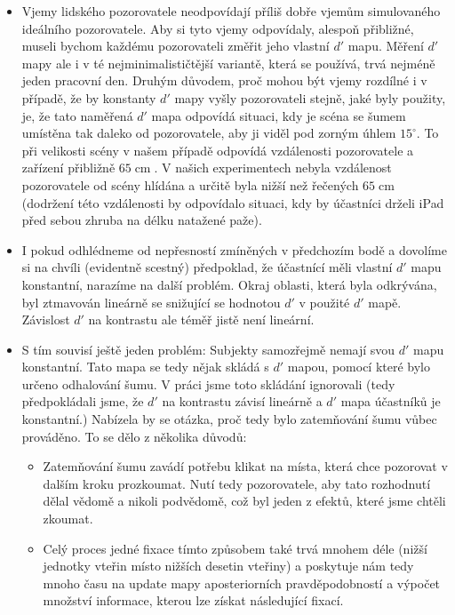 \begin{itemize}

\item Vjemy lidského pozorovatele neodpovídají příliš dobře vjemům simulovaného
ideálního pozorovatele. Aby si tyto vjemy odpovídaly, alespoň přibližné, museli
bychom každému pozorovateli změřit jeho vlastní $d'$ mapu. Měření $d'$ mapy ale
i  v té nejminimalističtější variantě, která se používá, trvá nejméně jeden
pracovní den. Druhým důvodem, proč mohou být vjemy rozdílné i v případě, že by
konstanty $d'$ mapy vyšly pozorovateli stejně, jaké byly použity, je, že tato
naměřená $d'$ mapa odpovídá situaci, kdy je scéna se šumem umístěna tak daleko
od pozorovatele, aby ji viděl pod zorným úhlem $15^\circ$. To při velikosti
scény v našem případě odpovídá vzdálenosti pozorovatele a zařízení přibližně
$65 \operatorname{cm}$. V našich experimentech nebyla vzdálenost pozorovatele od
scény hlídána a určitě byla nižší než řečených $65 \operatorname{cm}$
(dodržení této vzdálenosti by odpovídalo situaci, kdy by účastníci drželi iPad
před sebou zhruba na délku natažené paže). 

\item I pokud odhlédneme od nepřesností zmíněných v předchozím bodě a dovolíme
si na chvíli (evidentně scestný) předpoklad, že účastnící měli vlastní $d'$ mapu
konstantní, narazíme na další problém. Okraj oblasti, která byla odkrývána,
byl ztmavován lineárně se snižující se hodnotou $d'$ v použité $d'$ mapě.
Závislost $d'$ na kontrastu ale téměř jistě
není lineární.

\item S tím souvisí ještě jeden problém: Subjekty samozřejmě nemají svou $d'$
mapu konstantní. Tato mapa se tedy nějak skládá s $d'$ mapou, pomocí které
bylo určeno odhalování šumu. V práci jsme toto skládání ignorovali (tedy
předpokládali jsme, že $d'$ na kontrastu závisí lineárně a $d'$ mapa účastníků
je konstantní.) Nabízela by se otázka, proč tedy bylo zatemňování šumu vůbec
prováděno. To se dělo z několika důvodů:

\begin{itemize}

\item Zatemňování šumu zavádí potřebu klikat na místa, která chce pozorovat v
dalším kroku prozkoumat. Nutí tedy pozorovatele, aby tato rozhodnutí dělal
vědomě a nikoli podvědomě, což byl jeden z efektů, které jsme chtěli zkoumat.

\item Celý proces jedné fixace tímto způsobem také trvá mnohem déle (nižší
jednotky vteřin místo nižších desetin vteřiny) a poskytuje nám tedy mnoho času
na update mapy aposteriorních pravděpodobností a výpočet množství informace,
kterou lze získat následující fixací.


\end{itemize}
\end{itemize}
